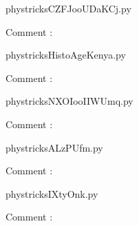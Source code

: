     \clearpage
    


    \newcommand{\CaptionFigCZFJooUDaKCj}{<+Type your caption here+>}
    \begin{center}
        
    \end{center}
    phystricksCZFJooUDaKCj.py

    Comment : 

    \clearpage
    


    \newcommand{\CaptionFigHistoAgeKenya}{<+Type your caption here+>}
    \begin{center}
        
    \end{center}
    phystricksHistoAgeKenya.py

    Comment : 

    \clearpage
    


    \newcommand{\CaptionFigNXOIooIIWUmq}{<+Type your caption here+>}
    \begin{center}
        
    \end{center}
    phystricksNXOIooIIWUmq.py

    Comment : 

    \clearpage
    


    \newcommand{\CaptionFigALzPUfm}{<+Type your caption here+>}
    \begin{center}
        
    \end{center}
    phystricksALzPUfm.py

    Comment : 

    \clearpage
    


    \newcommand{\CaptionFigIXtyOnk}{<+Type your caption here+>}
    \begin{center}
        
    \end{center}
    phystricksIXtyOnk.py

    Comment : 

    \clearpage
    


